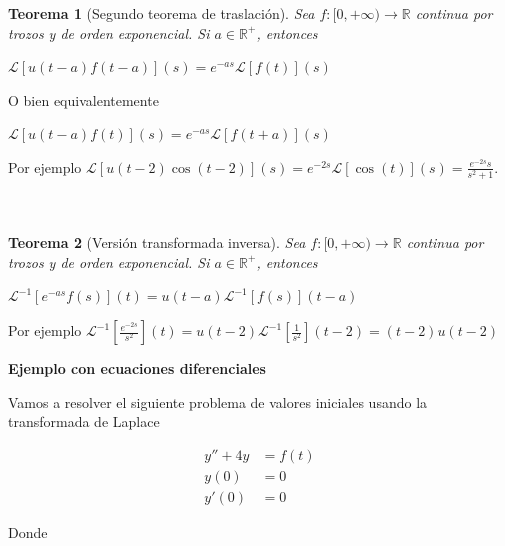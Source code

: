 \documentclass{article}
\theoremstyle{plain}
\newtheorem{thm}{Teorema}[section]
\theoremstyle{definition}
\begin{document}
\begin{thm}[Segundo teorema de traslación]Sea $f: [0,+\infty) \to \mathbb{R}$ continua por trozos y de orden exponencial. Si $a \in \mathbb{R}^+$, entonces
\end{thm}

\begin{center}
$\mathcal{L}[u(t-a)f(t-a)](s) =e^{-as}\mathcal{L}[f(t)](s)$
\end{center}

O bien equivalentemente


\begin{center}
$\mathcal{L}[u(t-a)f(t)](s) =e^{-as}\mathcal{L}[f(t+a)](s)$
\end{center}

Por ejemplo $\displaystyle \mathcal{L}[u(t-2)\cos(t-2)](s) =e^{-2s}\mathcal{L}[\cos(t)](s) = \frac{e^{-2s} s}{s^2+1}$. \\ \\ \\



\begin{thm}[Versión transformada inversa]Sea $f: [0,+\infty) \to \mathbb{R}$ continua por trozos y de orden exponencial. Si $a \in \mathbb{R}^+$, entonces
\end{thm}

\begin{center}
$\mathcal{L}^{-1}[e^{-as}f(s)](t) =u(t-a)\mathcal{L}^{-1}[f(s)](t-a)$
\end{center}


Por ejemplo $\displaystyle \mathcal{L}^{-1}\left[ \frac{e^{-2s}}{s^2} \right] (t)  = u(t-2) \mathcal{L}^{-1} \left[ \frac{1}{s^2} \right] (t-2) = (t-2)u(t-2)$ \\



\newpage


\begin{center}
\textbf{\large{Ejemplo con ecuaciones diferenciales}} \\
\end{center}

Vamos a resolver el siguiente problema de valores iniciales usando la transformada de Laplace


\begin{align*}
y''+4y &=f(t) \\
y(0)&=0 \\
y'(0)&=0
\end{align*}

Donde
\end{document}
